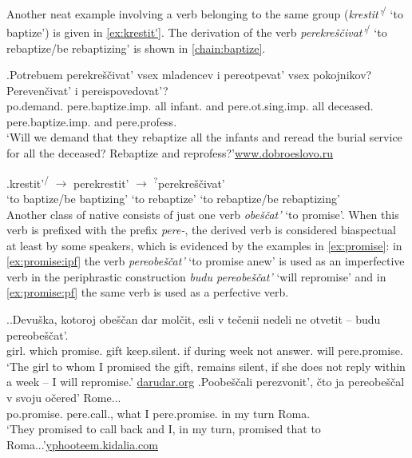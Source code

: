 Another neat example involving a verb belonging to the same group (\textit{krestit'}\textsuperscript{\IPF\slash\PF} `to baptize') is given in \ref{ex:krestit'}. The derivation of the verb \textit{perekre\v{s}\v{c}ivat'}\textsuperscript{\IPF\slash\PF} `to rebaptize/be rebaptizing' is shown in \ref{chain:baptize}.

\exg.\label{ex:krestit'}Potrebuem perekre\v{s}\v{c}ivat' vsex mladencev i pereotpevat' vsex pokojnikov? Pereven\v{c}ivat' i pereispovedovat'?\\
po.demand. pere.baptize.imp. all infant. and pere.ot.sing.imp. all deceased. pere.baptize.imp. and pere.profess.\\
\trans `Will we demand that they rebaptize all the infants and reread the burial service for all the deceased? Rebaptize and reprofess?'\hbox{}\hfill\hbox{\url{www.dobroeslovo.ru}}


\exg.\label{chain:baptize}krestit'\textsuperscript{\IPF\slash\PF} $\rightarrow$ perekrestit'\textsuperscript{\PF} $\rightarrow$ $^?$perekre\v{s}\v{c}ivat'\textsuperscript{\IPF}\\
{`to baptize/be baptizing'} {} {`to rebaptize'} {} {`to rebaptize/be rebaptizing'}\\

Another class of native  consists of just one verb \textit{obe\v{s}\v{c}at'} `to promise'. When this verb is prefixed with the  prefix \textit{pere-}, the derived verb is considered biaspectual at least by some speakers, which is evidenced by the examples in \ref{ex:promise}: in \ref{ex:promise:ipf} the verb \textit{pereobe\v{s}\v{c}at'} `to promise anew' is used as an imperfective verb in the periphrastic  construction \textit{budu pereobe\v{s}\v{c}at'} `will repromise' and in \ref{ex:promise:pf} the same verb is used as a perfective verb. 

\ex.\label{ex:promise}\ag.\label{ex:promise:ipf}Devu\v{s}ka, kotoroj obe\v{s}\v{c}an dar mol\v{c}it, esli {v te\v{c}enii} nedeli ne otvetit -- budu pereobe\v{s}\v{c}at'.\\
girl. which promise. gift keep.silent. if during week not answer. {}  will pere.promise.\\
\trans `The girl to whom I promised the gift, remains silent, if she does not reply within a week -- I will repromise.'
\hbox{}\hfill\hbox{\url{darudar.org}}
\bg.\label{ex:promise:pf}Poobe\v{s}\v{c}ali perezvonit', \v{c}to ja pereobe\v{s}\v{c}al v svoju o\v{c}ered' Rome...\\
po.promise. pere.call., what I pere.promise. in my turn Roma.\\
\trans `They promised to call back and I, in my turn, promised that to Roma...'\hbox{}\hfill\hbox{\url{yphooteem.kidalia.com}}

